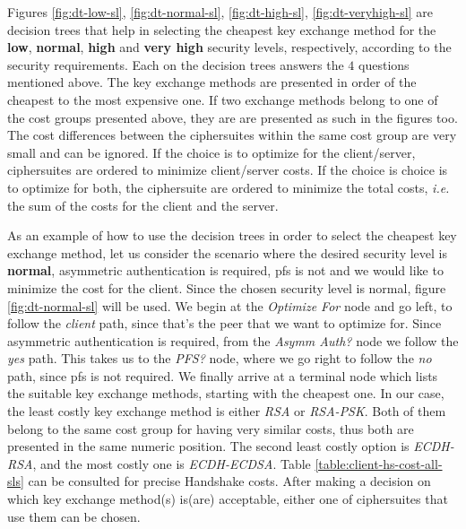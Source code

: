 \documentclass{llncs}
\begin{document}
Figures \ref{fig:dt-low-sl}, \ref{fig:dt-normal-sl}, \ref{fig:dt-high-sl}, \ref{fig:dt-veryhigh-sl} are decision trees that
help in selecting the cheapest key exchange method for the \textbf{low}, \textbf{normal}, \textbf{high} and \textbf{very high}
security levels, respectively, according to the security requirements. Each on the decision trees answers the $4$ questions
mentioned above. The key exchange methods are presented in order of the cheapest to the most expensive one. If two exchange methods
belong to one of the cost groups presented above, they are are presented as such in the figures too. The cost differences between
the ciphersuites within the same cost group are very small and can be ignored. If the choice is to optimize for the client/server,
ciphersuites are ordered to minimize client/server costs. If the choice is choice is to optimize for both, the
ciphersuite are ordered to minimize the total costs, \textit{i.e.} the sum of the costs for the client and the server.

As an example of how to use the decision trees in order to select the cheapest key exchange method, let us consider the scenario
where the desired security level is \textbf{normal}, asymmetric authentication is required, \gls{pfs} is not and we would like to
minimize the cost for the client. Since the chosen security level is normal, figure \ref{fig:dt-normal-sl} will be used.
We begin at the \textit{Optimize For} node and go left, to follow the \textit{client} path, since that's the peer that we
want to optimize for. Since asymmetric authentication is required, from the \textit{Asymm Auth?} node we follow the \textit{yes}
path. This takes us to the \textit{PFS?} node, where we go right to follow the \textit{no} path, since \gls{pfs} is not required.
We finally arrive at a terminal node which lists the suitable key exchange methods, starting with the cheapest one.
In our case, the least costly key exchange method is either \textit{RSA} or \textit{RSA-PSK}. Both of them belong to the same
cost group for having very similar costs, thus both are presented in the same numeric position. The second least costly option
is \textit{ECDH-RSA}, and the most costly one is \textit{ECDH-ECDSA}. Table \ref{table:client-hs-cost-all-sls} can be consulted for
precise Handshake costs. After making a decision on which key exchange method(s) is(are) acceptable, either one of ciphersuites that
use them can be chosen.
\end{document}
